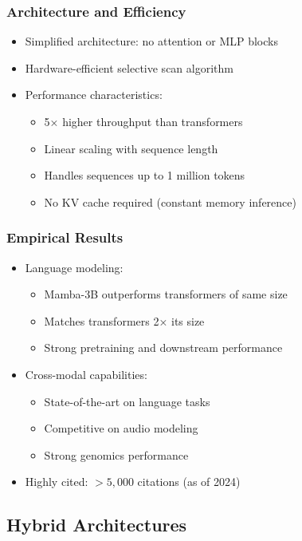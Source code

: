 \documentclass[11pt]{article}
\begin{document}
\subsubsection{Architecture and Efficiency}
\begin{itemize}[leftmargin=*]
    \item Simplified architecture: no attention or MLP blocks
    \item Hardware-efficient selective scan algorithm
    \item Performance characteristics:
    \begin{itemize}
        \item 5× higher throughput than transformers
        \item Linear scaling with sequence length
        \item Handles sequences up to 1 million tokens
        \item No KV cache required (constant memory inference)
    \end{itemize}
\end{itemize}

\subsubsection{Empirical Results}
\begin{itemize}[leftmargin=*]
    \item Language modeling:
    \begin{itemize}
        \item Mamba-3B outperforms transformers of same size
        \item Matches transformers 2× its size
        \item Strong pretraining and downstream performance
    \end{itemize}
    \item Cross-modal capabilities:
    \begin{itemize}
        \item State-of-the-art on language tasks
        \item Competitive on audio modeling
        \item Strong genomics performance
    \end{itemize}
    \item Highly cited: $>5,000$ citations (as of 2024)
\end{itemize}

\subsection{Hybrid Architectures}
\end{document}
